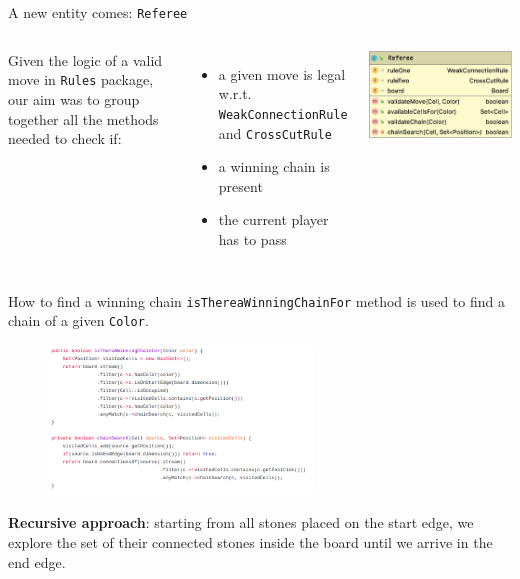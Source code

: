 \documentclass{beamer}
\begin{document}
\begin{frame}{A new entity comes: \texttt{Referee}}
 \begin{columns}
  Given the logic of a valid move in \texttt{Rules} package, our aim was to group together all the methods needed to check if:
  \vspace{0.4cm}
  \begin{itemize}
   \item a given move is legal w.r.t. \texttt{WeakConnectionRule} and \texttt{CrossCutRule}
   \vspace{0.25cm}
   \item a winning chain is present
   \vspace{0.25cm}
   \item the current player has to pass
  \end{itemize}
  
  
  \includegraphics[scale=0.27]{images/referee-class.jpg}
  
 \end{columns}
\end{frame}

\begin{frame}{How to find a winning chain}
 \texttt{isThereaWinningChainFor} method is used to find a chain of a given \texttt{Color}.
 
 
 \begin{figure}
  \includegraphics[scale=0.2, width=7cm]{images/chainsearch-code.png}
 \end{figure}
 
 \textbf{Recursive approach}: starting from all stones placed on the start edge, we explore the set of their connected stones inside the board until we arrive in the end edge.
\end{frame}
\end{document}
